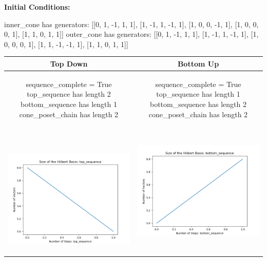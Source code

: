 \documentclass[10pt]{article}
\begin{document}
\textbf{Initial Conditions:}
\begin{SAGE}
inner_cone has generators: 
[[0, 1, -1, 1, 1], [1, -1, 1, -1, 1], [1, 0, 0, -1, 1], [1, 0, 0, 0, 1], [1, 1, 0, 1, 1]]
outer_cone has generators: 
[[0, 1, -1, 1, 1], [1, -1, 1, -1, 1], [1, 0, 0, 0, 1], [1, 1, -1, -1, 1], [1, 1, 0, 1, 1]]

\end{SAGE}
\begin{tabular}{c|c}
\textbf{Top Down} & \textbf{Bottom Up} \\ \hline  
\begin{SAGE}
	sequence_complete = True
	top_sequence has length 2
	bottom_sequence has length 1
	cone_poset_chain has length 2
\end{SAGE} 
&
\begin{SAGE}
	sequence_complete = True
	top_sequence has length 1
	bottom_sequence has length 2
	cone_poset_chain has length 2
\end{SAGE} 
\\ \hline
\
\begin{minipage}{.45\textwidth}
\includegraphics[width=\textwidth]{"DATA/5d/5 generators 1 bound B/top_sequence SIZE"}
\end{minipage} &
\begin{minipage}{.45\textwidth}
\includegraphics[width=\textwidth]{"DATA/5d/5 generators 1 bound B bottomup/bottom_sequence SIZE"}

\end{minipage}
\end{tabular}
\end{document}
